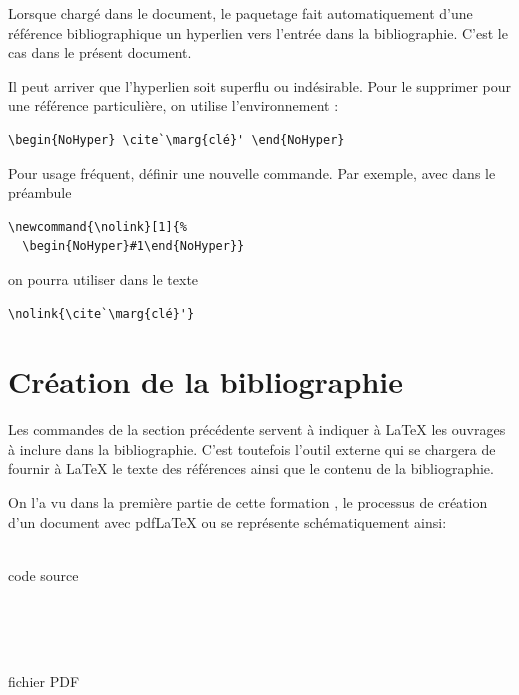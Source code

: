 \begin{conseil}
  Lorsque chargé dans le document, le paquetage  fait
  automatiquement d'une référence bibliographique un hyperlien vers
  l'entrée dans la bibliographie. C'est le cas dans le présent
  document.

  Il peut arriver que l'hyperlien soit superflu ou indésirable. Pour
  le supprimer pour une référence particulière, on utilise
  l'environnement :
\begin{lstlisting}
\begin{NoHyper} \cite`\marg{clé}' \end{NoHyper}
\end{lstlisting}
  Pour usage fréquent, définir une nouvelle commande. Par exemple,
  avec dans le préambule
\begin{lstlisting}
\newcommand{\nolink}[1]{%
  \begin{NoHyper}#1\end{NoHyper}}
\end{lstlisting}
  on pourra utiliser dans le texte
\begin{lstlisting}
\nolink{\cite`\marg{clé}'}
\end{lstlisting}
\end{conseil}



\section{Création de la bibliographie}
\label{sec:bibliographie:bibtex}

Les commandes de la section précédente servent à indiquer à {\LaTeX}
les ouvrages à inclure dans la bibliographie. C'est toutefois l'outil
externe {\BibTeX} qui se chargera de fournir à {\LaTeX} le texte des
références ainsi que le contenu de la bibliographie.

On l'a vu dans la première partie de cette formation
\citep{UL:latex:1}, le processus de création d'un document avec
pdf{\LaTeX} ou {\XeLaTeX} se représente schématiquement ainsi:
\begin{center}
  \sffamily
  \begin{minipage}[t]{0.12\linewidth}
    \centering
    {\LARGE\faFileTextO} \\ \medskip
    code source
  \end{minipage}
  \quad\faArrowRight\quad
  \begin{minipage}[t]{0.12\linewidth}
    \centering
    {\LARGE\faCogs} \\ \medskip
     \\ 
  \end{minipage}
  \quad\faArrowRight\quad
  \begin{minipage}[t]{0.12\linewidth}
    \centering
    {\LARGE\faFilePdfO} \\ \medskip
    fichier PDF
  \end{minipage}
\end{center}

